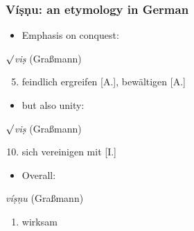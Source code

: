 \documentclass[pdf]{beamer}
\begin{document}
\begin{frame} \frametitle{Víṣṇu: an etymology in German}
\begin{itemize}
	\item Emphasis on conquest:
\end{itemize}

\begin{block} {$\surd$\textit{viṣ} (Graßmann)}
\begin{enumerate}
  \setcounter{enumi}{4}
  \item feindlich ergreifen [A.], bewältigen [A.]
\end{enumerate}
\end{block}

\begin{itemize}
	\item but also unity:
\end{itemize}

\begin{block} {$\surd$\textit{viṣ} (Graßmann)}
\begin{enumerate}
  \setcounter{enumi}{9}
  \item sich vereinigen mit [I.]
\end{enumerate}
\end{block}

\begin{itemize}
	\item Overall:
\end{itemize}

\begin{block} {\textit{víṣṇu} (Graßmann)}
\begin{enumerate}
  \item wirksam
\end{enumerate}
\end{block}
\end{frame}
\end{document}
